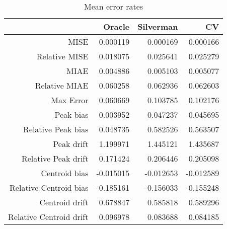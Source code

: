 \begin{table}[ht]
\centering
\begin{tabular}{rrrr}
  \hline
 & Oracle & Silverman & CV \\ 
  \hline
MISE & 0.000119 & 0.000169 & 0.000166 \\ 
  Relative MISE & 0.018075 & 0.025641 & 0.025279 \\ 
  MIAE & 0.004886 & 0.005103 & 0.005077 \\ 
  Relative MIAE & 0.060258 & 0.062936 & 0.062603 \\ 
  Max Error & 0.060669 & 0.103785 & 0.102176 \\ 
  Peak bias & 0.003952 & 0.047237 & 0.045695 \\ 
  Relative Peak bias & 0.048735 & 0.582526 & 0.563507 \\ 
  Peak drift & 1.199971 & 1.445121 & 1.435687 \\ 
  Relative Peak drift & 0.171424 & 0.206446 & 0.205098 \\ 
  Centroid bias & -0.015015 & -0.012653 & -0.012589 \\ 
  Relative Centroid bias & -0.185161 & -0.156033 & -0.155248 \\ 
  Centroid drift & 0.678847 & 0.585818 & 0.589296 \\ 
  Relative Centroid drift & 0.096978 & 0.083688 & 0.084185 \\ 
   \hline
\end{tabular}
\caption{Mean error rates} 
\label{tbl:mean_error_rates}
\end{table}
